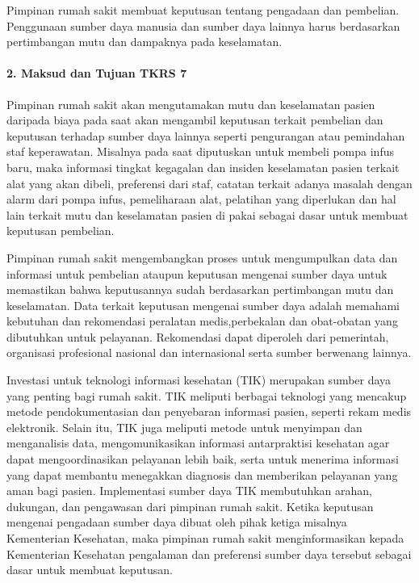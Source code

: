 \documentclass[
]{book}
\begin{document}
Pimpinan rumah sakit membuat keputusan tentang pengadaan dan pembelian. Penggunaan sumber daya manusia dan sumber daya lainnya harus berdasarkan pertimbangan mutu dan dampaknya pada keselamatan.

\hypertarget{maksud-dan-tujuan-tkrs-7}{%
\paragraph*{2. Maksud dan Tujuan TKRS 7}\label{maksud-dan-tujuan-tkrs-7}}

Pimpinan rumah sakit akan mengutamakan mutu dan keselamatan pasien daripada biaya pada saat akan mengambil keputusan terkait pembelian dan keputusan terhadap sumber daya lainnya seperti pengurangan atau pemindahan staf keperawatan. Misalnya pada saat diputuskan untuk membeli pompa infus baru, maka informasi tingkat kegagalan dan insiden keselamatan pasien terkait alat yang akan dibeli, preferensi dari staf, catatan terkait adanya masalah dengan alarm dari pompa infus, pemeliharaan alat, pelatihan yang diperlukan dan hal lain terkait mutu dan keselamatan pasien di pakai sebagai dasar untuk membuat keputusan pembelian.

Pimpinan rumah sakit mengembangkan proses untuk mengumpulkan data dan informasi untuk pembelian ataupun keputusan mengenai sumber daya untuk memastikan bahwa keputusannya sudah berdasarkan pertimbangan mutu dan keselamatan.
Data terkait keputusan mengenai sumber daya adalah memahami kebutuhan dan rekomendasi peralatan medis,perbekalan dan obat-obatan yang dibutuhkan untuk pelayanan. Rekomendasi dapat diperoleh dari pemerintah, organisasi profesional nasional dan internasional serta sumber berwenang lainnya.

Investasi untuk teknologi informasi kesehatan (TIK) merupakan sumber daya yang penting bagi rumah sakit. TIK meliputi berbagai teknologi yang mencakup metode pendokumentasian dan penyebaran informasi pasien, seperti rekam medis elektronik. Selain itu, TIK juga meliputi metode untuk menyimpan dan menganalisis data, mengomunikasikan informasi antarpraktisi kesehatan agar dapat mengoordinasikan pelayanan lebih baik, serta untuk menerima informasi yang dapat membantu menegakkan diagnosis dan memberikan pelayanan yang aman bagi pasien. Implementasi sumber daya TIK membutuhkan arahan, dukungan, dan pengawasan dari pimpinan rumah sakit. Ketika keputusan mengenai pengadaan sumber daya dibuat oleh pihak ketiga misalnya Kementerian Kesehatan, maka pimpinan rumah sakit menginformasikan kepada Kementerian Kesehatan pengalaman dan preferensi sumber daya tersebut sebagai dasar untuk membuat keputusan.
\end{document}
